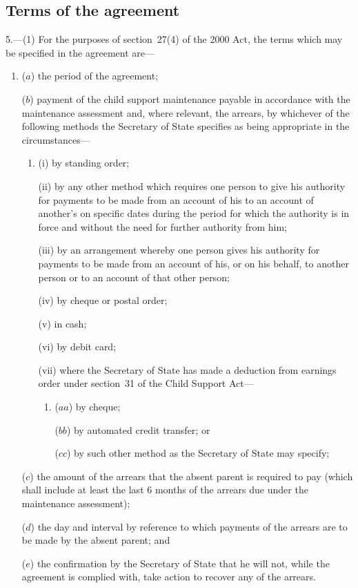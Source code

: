 \documentclass[12pt,a4paper]{article}
\begin{document}
\subsection[5. Terms of the agreement]{Terms of the agreement}

5.---(1)  For the purposes of section~27(4) of the 2000 Act, the terms which may be specified in the agreement are—
\begin{enumerate}\item[]
($a$) the period of the agreement;

($b$) payment of the child support maintenance payable in accordance with the maintenance assessment and, where relevant, the arrears, by whichever of the following methods the Secretary of State specifies as being appropriate in the circumstances—
\begin{enumerate}\item[]
(i) by standing order;

(ii) by any other method which requires one person to give his authority for payments to be made from an account of his to an account of another’s on specific dates during the period for which the authority is in force and without the need for further authority from him;

(iii) by an arrangement whereby one person gives his authority for payments to be made from an account of his, or on his behalf, to another person or to an account of that other person;

(iv) by cheque or postal order;

(v) in cash;

(vi) by debit card;

(vii) where the Secretary of State has made a deduction from earnings order under section~31 of the Child Support Act—
\begin{enumerate}\item[]
($aa$) by cheque;

($bb$) by automated credit transfer; or

($cc$) by such other method as the Secretary of State may specify;
\end{enumerate}
\end{enumerate}

($c$) the amount of the arrears that the absent parent is required to pay (which shall include at least the last 6 months of the arrears due under the maintenance assessment);

($d$) the day and interval by reference to which payments of the arrears are to be made by the absent parent; and

($e$) the confirmation by the Secretary of State that he will not, while the agreement is complied with, take action to recover any of the arrears.
\end{enumerate}
\end{document}
